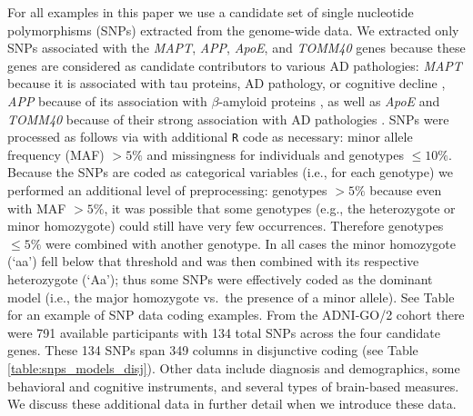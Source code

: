 \documentclass[12pt]{article}
\begin{document}
For all examples in this paper we use a candidate set of single
nucleotide polymorphisms (SNPs) extracted from the genome-wide data. We
extracted only SNPs associated with the \textit{MAPT}, \textit{APP},
\textit{ApoE}, and \textit{TOMM40} genes because these genes are
considered as candidate contributors to various AD pathologies:
\textit{MAPT} because it is associated with tau proteins, AD pathology,
or cognitive decline
\citep{myers_h1c_2005, trabzuni_mapt_2012, desikan_genetic_2015, cruchaga_rare_2012, peterson_variants_2014},
\textit{APP} because of its association with \(\beta\)-amyloid proteins
\citep{cruchaga_rare_2012, huang_apoe2_2017, jonsson_mutation_2012}, as
well as \textit{ApoE} and \textit{TOMM40} because of their strong
association with AD pathologies
\citep{linnertz_cis-regulatory_2014, roses_tomm40_2010-1, bennet_pleiotropy_2010, huang_apoe2_2017}.
SNPs were processed as follows via \citet{purcell2007plink} with
additional \texttt{R} code as necessary: minor allele frequency (MAF)
\(> 5\%\) and missingness for individuals and genotypes \(\leq 10\%\).
Because the SNPs are coded as categorical variables (i.e., for each
genotype) we performed an additional level of preprocessing: genotypes
\(> 5\%\) because even with MAF \(> 5\%\), it was possible that some
genotypes (e.g., the heterozygote or minor homozygote) could still have
very few occurrences. Therefore genotypes \(\leq 5\%\) were combined
with another genotype. In all cases the minor homozygote (`aa') fell
below that threshold and was then combined with its respective
heterozygote (`Aa'); thus some SNPs were effectively coded as the
dominant model (i.e., the major homozygote vs.~the presence of a minor
allele). See Table for an example of SNP data coding examples. From the
ADNI-GO/2 cohort there were 791 available participants with 134 total
SNPs across the four candidate genes. These 134 SNPs span 349 columns in
disjunctive coding (see Table \ref{table:snps_models_disj}). Other data
include diagnosis and demographics, some behavioral and cognitive
instruments, and several types of brain-based measures. We discuss these
additional data in further detail when we introduce these data.
\end{document}
